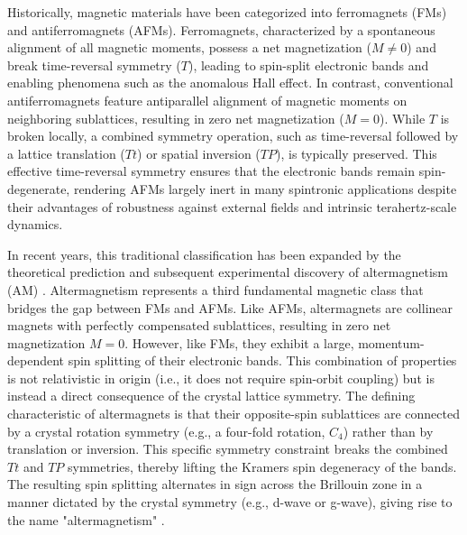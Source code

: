 \documentclass{article}
\begin{document}
Historically, magnetic materials have been categorized into ferromagnets (FMs) and antiferromagnets (AFMs). Ferromagnets, characterized by a spontaneous alignment of all magnetic moments, possess a net magnetization ($M\neq 0$) and break time-reversal symmetry ($T$), leading to spin-split electronic bands and enabling phenomena such as the anomalous Hall effect. In contrast, conventional antiferromagnets feature antiparallel alignment of magnetic moments on neighboring sublattices, resulting in zero net magnetization ($M=0$). While $T$ is broken locally, a combined symmetry operation, such as time-reversal followed by a lattice translation ($Tt$) or spatial inversion ($TP$), is typically preserved. This effective time-reversal symmetry ensures that the electronic bands remain spin-degenerate, rendering AFMs largely inert in many spintronic applications despite their advantages of robustness against external fields and intrinsic terahertz-scale dynamics.

In recent years, this traditional classification has been expanded by the theoretical prediction and subsequent experimental discovery of altermagnetism (AM) \cite{smejkal2022emerging, mazin2022editorial}. Altermagnetism represents a third fundamental magnetic class that bridges the gap between FMs and AFMs. Like AFMs, altermagnets are collinear magnets with perfectly compensated sublattices, resulting in zero net magnetization \(M = 0\). However, like FMs, they exhibit a large, momentum-dependent spin splitting of their electronic bands. This combination of properties is not relativistic in origin (i.e., it does not require spin-orbit coupling) but is instead a direct consequence of the crystal lattice symmetry. The defining characteristic of altermagnets is that their opposite-spin sublattices are connected by a crystal rotation symmetry (e.g., a four-fold rotation, $C_4$) rather than by translation or inversion. This specific symmetry constraint breaks the combined $Tt$ and $TP$ symmetries, thereby lifting the Kramers spin degeneracy of the bands. The resulting spin splitting alternates in sign across the Brillouin zone in a manner dictated by the crystal symmetry (e.g., d-wave or g-wave), giving rise to the name "altermagnetism" \cite{smejkal2022beyond}.
\end{document}
